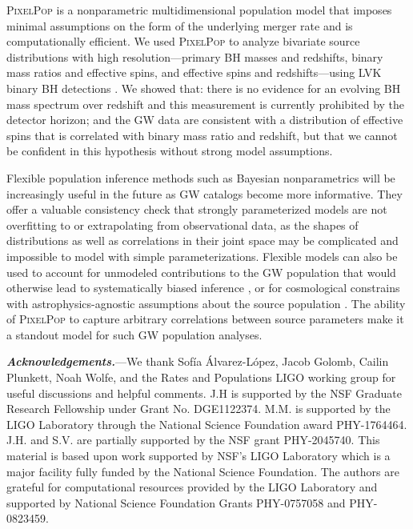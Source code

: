 \documentclass[%
 reprint,
 amsmath,amssymb,
 aps,
 prl,
 nofootinbib,nobibnotes,
]{revtex4-2}
\newcommand{\heading}[1]{\textbf{\textit{#1.}}}
\begin{document}
\textsc{PixelPop} \cite{Heinzel:2024jlc} is a nonparametric multidimensional population model that imposes minimal assumptions on the form of the underlying merger rate and is computationally efficient. We used \textsc{PixelPop} to analyze bivariate source distributions with high resolution---primary BH masses and redshifts, binary mass ratios and effective spins, and effective spins and redshifts---using LVK binary BH detections \cite{LIGOScientific:2018mvr, LIGOScientific:2020ibl, LIGOScientific:2021usb, LIGOScientific:2021djp}. We showed that: there is no evidence for an evolving BH mass spectrum over redshift and this measurement is currently prohibited by the detector horizon; and the GW data are consistent with a distribution of effective spins that is correlated with binary mass ratio and redshift, but that we cannot be confident in this hypothesis without strong model assumptions.

Flexible population inference methods such as Bayesian nonparametrics will be increasingly useful in the future as GW catalogs become more informative. They offer a valuable consistency check that strongly parameterized models are not overfitting to or extrapolating from observational data, as the shapes of distributions as well as correlations in their joint space may be complicated and impossible to model with simple parameterizations. Flexible models can also be used to account for unmodeled contributions to the GW population that would otherwise lead to systematically biased inference \cite{Cheng:2023ddt}, or for cosmological constrains with astrophysics-agnostic assumptions about the source population \cite{MaganaHernandez:2024uty, Farah:2024xub}. The ability of \textsc{PixelPop} to capture arbitrary correlations between source parameters make it a standout model for such GW population analyses.

\heading{Acknowledgements}---We thank Sofía Álvarez-López, Jacob Golomb, Cailin Plunkett, Noah Wolfe, and the Rates and Populations LIGO working group for useful discussions and helpful comments.
%
J.H is supported by the NSF Graduate Research Fellowship under Grant No. DGE1122374.
%
M.M. is supported by the LIGO Laboratory through the National Science Foundation award PHY-1764464.
%
J.H. and S.V. are partially supported by the NSF grant PHY-2045740.
%
This material is based upon work supported by NSF's LIGO Laboratory which is a major facility fully funded by the National Science Foundation.
%
The authors are grateful for computational resources provided by the LIGO Laboratory and supported by National Science Foundation Grants PHY-0757058 and PHY-0823459.


\end{document}

